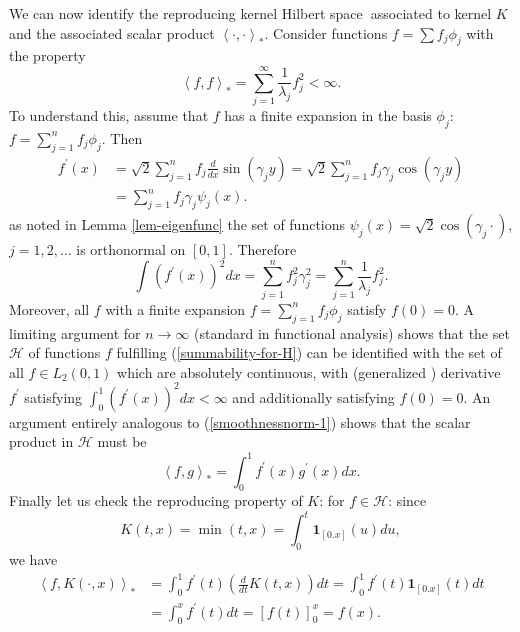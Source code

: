 \documentclass[11pt,twoside]{article}%
\theoremstyle{change}
\begin{document}
We can now identify the reproducing kernel Hilbert space\textbf{\ }associated
to kernel $K$ and the associated scalar product $\left\langle \cdot
,\cdot\right\rangle _{\ast}$. Consider functions $f=\sum f_{j}\phi_{j}$ with
the property
\begin{equation}
\left\langle f,f\right\rangle _{\ast}=\sum_{j=1}^{\infty}\frac{1}{\lambda_{j}%
}f_{j}^{2}<\infty.\label{summability-for-H}%
\end{equation}
To understand this, assume that $f$ has a finite expansion in the basis
$\phi_{j}$: $f=\sum_{j=1}^{n}f_{j}\phi_{j}.$ Then
\begin{align*}
f^{\prime}(x)  & =\sqrt{2}\sum_{j=1}^{n}f_{j}\frac{d}{dx}\sin\left(
\gamma_{j}y\right)  =\sqrt{2}\sum_{j=1}^{n}f_{j}\gamma_{j}\cos\left(
\gamma_{j}y\right) \\
& =\sum_{j=1}^{n}f_{j}\gamma_{j}\psi_{j}(x).
\end{align*}
as noted in Lemma \ref{lem-eigenfunc} the set of functions $\psi_{j}%
(x)=\sqrt{2}\cos\left(  \gamma_{j}\cdot\right)  $, $j=1,2,\ldots$ is
orthonormal on $[0,1].$ Therefore
\begin{equation}
\int\left(  f^{\prime}(x)\right)  ^{2}dx=\sum_{j=1}^{n}f_{j}^{2}\gamma_{j}%
^{2}=\sum_{j=1}^{n}\frac{1}{\lambda_{j}}f_{j}^{2}.\label{smoothnessnorm-1}%
\end{equation}
Moreover, all $f$ with a finite expansion $f=\sum_{j=1}^{n}f_{j}\phi_{j}$
satisfy $f(0)=0$. A limiting argument for $n\rightarrow\infty$ (standard in
functional analysis) shows that the set $\mathcal{H}$ of functions $f$
fulfilling (\ref{summability-for-H}) can be identified with the set of all
$f\in L_{2}(0,1)$ which are absolutely continuous, with (generalized )
derivative $f^{\prime}$ satisfying $\int_{0}^{1}\left(  f^{\prime}(x)\right)
^{2}dx<\infty$ and additionally satisfying $f(0)=0$. An argument entirely
analogous to (\ref{smoothnessnorm-1}) shows that the scalar product in
$\mathcal{H}$ must be
\begin{equation}
\left\langle f,g\right\rangle _{\ast}=\int_{0}^{1}f^{\prime}(x)g^{\prime
}(x)dx.\label{sclar-prod-rkhs}%
\end{equation}
Finally let us check the reproducing property of $K$: for $f\in\mathcal{H}$:
since
\[
K(t,x)=\min(t,x)=\int_{0}^{t}\mathbf{1}_{\left[  0.x\right]  }(u)du,
\]
we have
\begin{align*}
\left\langle f,K\left(  \cdot,x\right)  \right\rangle _{\ast}  & =\int_{0}%
^{1}f^{\prime}(t)\left(  \frac{d}{dt}K(t,x)\right)  dt=\int_{0}^{1}f^{\prime
}(t)\mathbf{1}_{\left[  0.x\right]  }(t)dt\\
& =\int_{0}^{x}f^{\prime}(t)dt=\left[  f(t)\right]  _{0}^{x}=f(x).
\end{align*}
\end{document}
